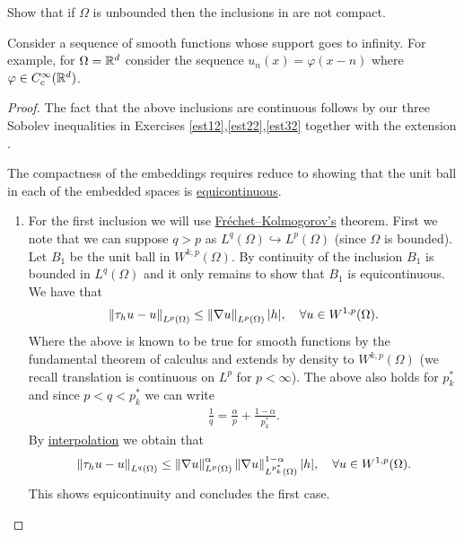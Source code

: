 \documentclass[
    a4paper,
    DIV=14,
    abstract=true,
    numbers=noenddot
]{scrartcl}
\begin{document}
\begin{exercise}
	Show that if $\Omega$ is unbounded then the inclusions in  are not compact.
\end{exercise}
\begin{hint}
	Consider a sequence of smooth functions whose support goes to infinity. For example, for $\Omega = \mathbb{R}^d$ consider the sequence $u_n(x) = \varphi(x-n)$ where $\varphi\in C^\infty_c(\mathbb{R}^d)$.
\end{hint}
\begin{proof}
	The fact that the above inclusions are continuous follows by our three Sobolev inequalities in Exercises \ref{est12},\ref{est22},\ref{est32} together with the extension .

	The compactness of the embeddings requires reduce to showing that the unit ball in each of the embedded spaces is \href{https://en.wikipedia.org/wiki/Equicontinuity}{equicontinuous}.
	\begin{enumerate}
		\item     For the first inclusion we will use \href{https://en.wikipedia.org/wiki/Fr%C3%A9chet%E2%80%93Kolmogorov_theorem}{Fréchet–Kolmogorov's} theorem. First we note that we can suppose $q>p$ as  $L^q(\Omega) \hookrightarrow L^p(\Omega)$ (since $\Omega$ is bounded). Let $B_1$ be the unit ball in $W^{k,p}(\Omega)$. By continuity of the inclusion $B_1$ is bounded in $L^q(\Omega)$ and it only remains to show that  $B_1$ is equicontinuous. We have that
		      \begin{align*}
			      \left\lVert \tau_h u-u \right\rVert_{L^p(\Omega)}\leq \left\lVert \nabla u \right\rVert_{L^p(\Omega)}{\left| h \right|} , \quad\forall u \in W^{1,p}(\Omega) .
		      \end{align*}
		      Where the above is known to be true for smooth functions by the fundamental theorem of calculus and extends by density to $W^{k,p}(\Omega)$ (we recall translation is continuous on $L^p$ for  $p<\infty$). The above also holds for $p_k^*$ and since $p<q<p_k^*$ we can write
		      \begin{align*}
			      \frac{1}{q}=\frac{\alpha}{p}+\frac{1-\alpha}{p_k^*}   .
		      \end{align*}
		      By \href{https://en.wikipedia.org/wiki/Riesz%E2%80%93Thorin_theorem#:~:text=the%20sumset%20formulation.-,Riesz%E2%80%93Thorin,-interpolation%20theorem%C2%A0%E2%80%94%C2%A0}{interpolation} we obtain that
		      \begin{align*}
			      \left\lVert \tau_h u-u \right\rVert_{L^q(\Omega)}\leq \left\lVert \nabla u \right\rVert_{L^p(\Omega)}^\alpha\left\lVert \nabla u \right\rVert_{L^{p_k^*}(\Omega)}^{1-\alpha}{\left| h \right|} , \quad\forall u \in W^{1,p}(\Omega) .
		      \end{align*}
		      This shows equicontinuity and concludes the first case.


\end{enumerate}
\end{proof}
\end{document}
